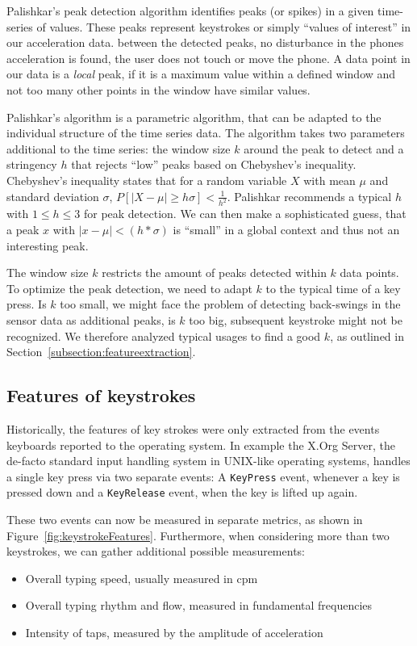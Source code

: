 Palishkar's peak detection algorithm identifies peaks (or spikes) in a given time-series of values. These peaks represent keystrokes or simply ``values of interest'' in our acceleration data. between the detected peaks, no disturbance in the phones acceleration is found, \ie the user does not touch or move the phone. A data point in our data is a \emph{local} peak, if it is a maximum value within a defined window and not too many other points in the window have similar values.

Palishkar's algorithm is a parametric algorithm, that can be adapted to the individual structure of the time series data. The algorithm takes two parameters additional to the time series: the window size $k$ around the peak to detect and a stringency $h$ that rejects ``low'' peaks based on Chebyshev's inequality. Chebyshev's inequality states that for a random variable $X$ with mean $\mu$ and standard deviation $\sigma$, $P[|X - \mu| \geq h\sigma] < \frac{1}{h^2}$. Palishkar recommends a typical $h$ with $1 \leq h \leq 3$ for peak detection. We can then make a sophisticated guess, that a peak $x$ with $|x - \mu| < (h * \sigma)$ is ``small'' in a global context and thus not an interesting peak.

The window size $k$ restricts the amount of peaks detected within $k$ data points. To optimize the peak detection, we need to adapt $k$ to the typical time of a key press. Is $k$ too small, we might face the problem of detecting back-swings in the sensor data as additional peaks, is $k$ too big, subsequent keystroke might not be recognized. We therefore analyzed typical usages to find a good $k$, as outlined in Section~\ref{subsection:featureextraction}.

\subsection{Features of keystrokes}
Historically, the features of key strokes were only extracted from the events keyboards reported to the operating system. In example the X.Org Server, the de-facto standard input handling system in UNIX-like operating systems, handles a single key press via two separate events: A \lstinline$KeyPress$ event, whenever a key is pressed down and a \lstinline$KeyRelease$ event, when the key is lifted up again.

These two events can now be measured in separate metrics, as shown in Figure~\ref{fig:keystrokeFeatures}. Furthermore, when considering more than two keystrokes, we can gather additional possible measurements:
\begin{itemize}
    \item Overall typing speed, usually measured in \gls{cpm}
    \item Overall typing rhythm and flow, measured in fundamental frequencies
    \item Intensity of taps, measured by the amplitude of acceleration
\end{itemize}

